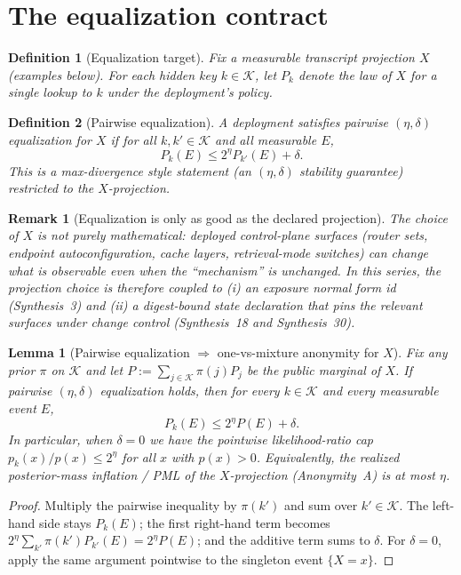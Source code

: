 \documentclass[11pt]{article}
\newtheorem{definition}{Definition}
\newtheorem{lemma}{Lemma}
\newtheorem{remark}{Remark}
\begin{document}
\section{The equalization contract}
\begin{definition}[Equalization target]
Fix a measurable transcript projection $X$ (examples below).
For each hidden key $k\in\mathcal K$, let $P_k$ denote the law of $X$ for a single lookup to $k$ under the deployment's policy.
\end{definition}

\begin{definition}[Pairwise equalization]
A deployment satisfies \emph{pairwise $(\eta,\delta)$ equalization} for $X$ if for all $k,k'\in\mathcal K$ and all measurable $E$,
\[
P_k(E)\le 2^{\eta}P_{k'}(E)+\delta.
\]
This is a max-divergence style statement (an $(\eta,\delta)$ stability guarantee) restricted to the $X$-projection.
\end{definition}


\begin{remark}[Equalization is only as good as the declared projection]
The choice of $X$ is not purely mathematical: deployed control-plane surfaces (router sets, endpoint autoconfiguration, cache layers, retrieval-mode switches) can change what is observable even when the ``mechanism'' is unchanged.
In this series, the projection choice is therefore coupled to (i) an exposure normal form id (Synthesis~3) and (ii) a digest-bound state declaration that pins the relevant surfaces under change control (Synthesis~18 and Synthesis~30).\cite{series:traceifaces,series:planstateequiv,series:deployedsurfaces}
\end{remark}
\begin{lemma}[Pairwise equalization $\Rightarrow$ one-vs-mixture anonymity for $X$]
\label{lem:pairwise-to-mixture}
Fix any prior $\pi$ on $\mathcal K$ and let $P:=\sum_{j\in\mathcal K}\pi(j)P_j$ be the public marginal of $X$.
If pairwise $(\eta,\delta)$ equalization holds, then for every $k\in\mathcal K$ and every measurable event $E$,
\[
P_k(E)\le 2^{\eta}P(E)+\delta.
\]
In particular, when $\delta=0$ we have the pointwise likelihood-ratio cap $p_k(x)/p(x)\le 2^{\eta}$ for all $x$ with $p(x)>0$.
Equivalently, the realized posterior-mass inflation / PML of the $X$-projection (Anonymity~A) is at most $\eta$.
\end{lemma}

\begin{proof}
Multiply the pairwise inequality by $\pi(k')$ and sum over $k'\in\mathcal K$.
The left-hand side stays $P_k(E)$; the first right-hand term becomes $2^{\eta}\sum_{k'}\pi(k')P_{k'}(E)=2^{\eta}P(E)$; and the additive term sums to $\delta$.
For $\delta=0$, apply the same argument pointwise to the singleton event $\{X=x\}$.
\end{proof}
\end{document}
